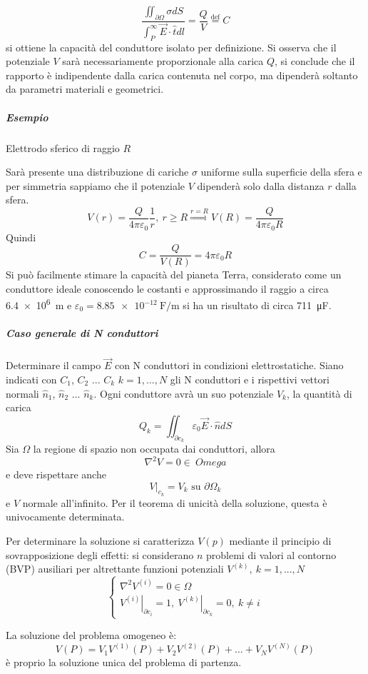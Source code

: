 $$
\frac{\iint_{\partial \Omega}\sigma dS }{\int_P^\infty \vec{E}\cdot\hat{t}dl } = \frac{Q}{V} \stackrel{\text{def}}{=} C
$$
si ottiene la capacità del conduttore isolato per definizione.
Si osserva che il potenziale $V$ sarà necessariamente proporzionale alla carica $Q$, si 
conclude che il rapporto è indipendente dalla carica contenuta nel corpo, ma dipenderà soltanto da
parametri materiali e geometrici.
\subparagraph{Esempio}
Elettrodo sferico di raggio $R$

Sarà presente una distribuzione di cariche $\sigma$ uniforme sulla superficie della sfera
e per simmetria sappiamo che il potenziale $V$ dipenderà solo dalla distanza $r$ dalla sfera.
$$
V(r) = \frac{Q}{4 \pi \varepsilon_0}\frac{1}{r},\ r\geq R \stackrel{r=R}{\Rightarrow} V(R) = 
\frac{Q}{4\pi\varepsilon_0 R}
$$
Quindi 
$$
C = \frac{Q}{V(R)} = 4\pi\varepsilon_0 R
$$
Si può facilmente stimare la capacità del pianeta Terra, considerato come un conduttore ideale
conoscendo le costanti e approssimando il raggio a circa \SI{6.4e6}{\meter} e $\varepsilon_0 = 
\SI{8.85e-12}{\farad\per\meter}$ si ha un risultato di circa \SI{711}{\micro\farad}.

\subparagraph{Caso generale di N conduttori}
Determinare il campo $\vec{E}$ con N conduttori in condizioni elettrostatiche.
Siano indicati con $C_1$, $C_2$ ... $C_k$ $k=1,...,N$ gli N conduttori e i rispettivi vettori normali
$\hat{n}_1$, $\hat{n}_2$ ... $\hat{n}_k$.
Ogni conduttore avrà un suo potenziale $V_k$, la quantità di carica 
$$
Q_k = \iint_{\partial c_k} \varepsilon_0 \vec{E}\cdot\hat{n} dS
$$
Sia $\Omega$ la regione di spazio non occupata dai conduttori, allora
$$
\nabla^2 V = 0 \in \ Omega 
$$
e deve rispettare anche
$$
\left. V \right|_{c_k} = V_k \text{ su } \partial \Omega_k
$$
e $V$ normale all'infinito.
Per il teorema di unicità della soluzione, questa è univocamente determinata.

Per determinare la soluzione si caratterizza $V(p)$ mediante il principio di sovrapposizione degli effetti:
si considerano $n$ problemi di valori al contorno (BVP) ausiliari per altrettante funzioni
potenziali $V^{(k)},\ k=1,...,N$
$$
\begin{cases}
\nabla^2 V^{(i)} = 0 \in \Omega \\
\left.V^{(i)}\right|_{\partial c_i} =  1,\ \left.V^{(k)}\right|_{\partial c_k} = 0,\ k \neq i
\end{cases}
$$

La soluzione del problema omogeneo è:
$$
V(P) = V_1 V^{(1)}(P) + V_2 V^{(2)}(P) + ... + V_NV^{(N)}(P)
$$
è proprio la soluzione unica del problema di partenza.
